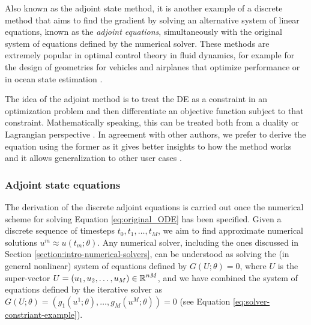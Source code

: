 Also known as the adjoint state method, it is another example of a discrete method that aims to find the gradient by solving an alternative system of linear equations, known as the \textit{adjoint equations}, simultaneously with the original system of equations defined by the numerical solver. 
These methods are extremely popular in optimal control theory in fluid dynamics, for example for the design of geometries for vehicles and airplanes that optimize performance \cite{Elliott_Peraire_1996, Giles_Pierce_2000} or in ocean state estimation \cite{Wunsch.2007,Wunsch:2008fp}.

The idea of the adjoint method is to treat the DE as a constraint in an optimization problem and then differentiate an objective function subject to that constraint. 
Mathematically speaking, this can be treated both from a duality or Lagrangian perspective \cite{Giles_Pierce_2000}.
In agreement with other authors, we prefer to derive the equation using the former as it gives better insights to how the method works and it allows generalization to other user cases \cite{Givoli_2021}. 

\subsubsection{Adjoint state equations}


The derivation of the discrete adjoint equations is carried out once the numerical scheme for solving Equation \eqref{eq:original_ODE} has been specified.  
Given a discrete sequence of timesteps $t_0, t_1, \ldots, t_M$, we aim to find approximate numerical solutions $u^m \approx u(t_m; \theta)$. 
Any numerical solver, including the ones discussed in Section \ref{section:intro-numerical-solvers}, can be understood as solving the (in general nonlinear) system of equations defined by $G(U; \theta) = 0$, where $U$ is the super-vector $U = (u_1, u_2, \ldots, u_M) \in \operatorname{\mathbb{R}}^{nM}$, and we have combined the system of equations defined by the iterative solver as $G(U; \theta) = (g_1(u^1; \theta), \ldots, g_M(u^M; \theta)) = 0$ (see Equation \eqref{eq:solver-constriant-example}).

